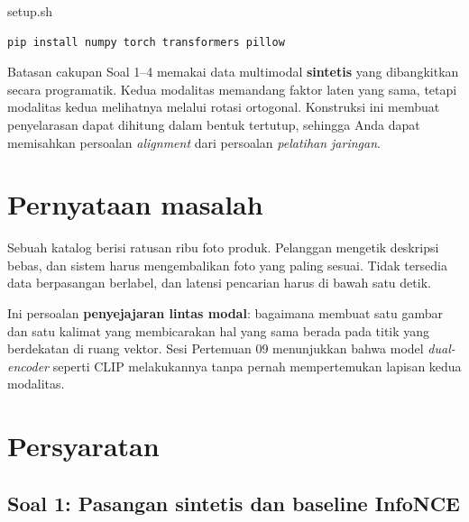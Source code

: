 \documentclass[12pt, a4paper]{article}
\begin{document}
\begin{codewindow}{setup.sh}
\begin{lstlisting}[style=pycode]
pip install numpy torch transformers pillow
\end{lstlisting}
\end{codewindow}

\begin{minipage}{\linewidth}
\begin{bclogo}[couleur=ctpMantle, arrondi=0.1, logo=\bcinfo, ombre=false, couleurBord=ctpSurface, epBord=0.6]{Batasan cakupan}
  Soal 1--4 memakai data multimodal \textbf{sintetis} yang dibangkitkan secara programatik.
  Kedua modalitas memandang faktor laten yang sama, tetapi modalitas kedua melihatnya
  melalui rotasi ortogonal. Konstruksi ini membuat penyelarasan dapat dihitung dalam
  bentuk tertutup, sehingga Anda dapat memisahkan persoalan \emph{alignment} dari
  persoalan \emph{pelatihan jaringan}.
\end{bclogo}
\end{minipage}

\section{Pernyataan masalah}\label{sec:intro}

Sebuah katalog berisi ratusan ribu foto produk. Pelanggan mengetik deskripsi bebas, dan
sistem harus mengembalikan foto yang paling sesuai. Tidak tersedia data berpasangan
berlabel, dan latensi pencarian harus di bawah satu detik.

Ini persoalan \textbf{penyejajaran lintas modal}: bagaimana membuat satu gambar
dan satu kalimat yang membicarakan hal yang sama berada pada titik yang berdekatan di
ruang vektor. Sesi Pertemuan 09 menunjukkan bahwa model \emph{dual-encoder} seperti CLIP
melakukannya tanpa pernah mempertemukan lapisan kedua modalitas.

\section{Persyaratan}\label{sec:requirements}

\subsection{Soal 1: Pasangan sintetis dan baseline InfoNCE}
\end{document}
